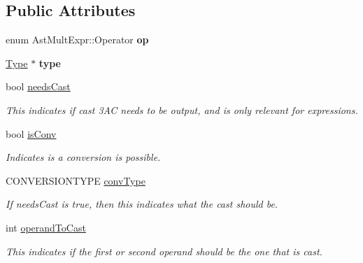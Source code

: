 \subsection*{Public Attributes}
\begin{DoxyCompactItemize}
\item 
\hypertarget{classAstMultExpr_a8e5af1710cd0ec88481fb7614dc8ec79}{enum Ast\-Mult\-Expr\-::\-Operator {\bfseries op}}\label{classAstMultExpr_a8e5af1710cd0ec88481fb7614dc8ec79}

\item 
\hypertarget{classAstMultExpr_a150b539fed2edaa374037362d9ae7c8a}{\hyperlink{classType}{Type} $\ast$ {\bfseries type}}\label{classAstMultExpr_a150b539fed2edaa374037362d9ae7c8a}

\item 
\hypertarget{classAST_aaf215802de409f8096c063d01ffa6783}{bool \hyperlink{classAST_aaf215802de409f8096c063d01ffa6783}{needs\-Cast}}\label{classAST_aaf215802de409f8096c063d01ffa6783}

\begin{DoxyCompactList}\small\item\em This indicates if cast 3\-A\-C needs to be output, and is only relevant for expressions. \end{DoxyCompactList}\item 
\hypertarget{classAST_afa9e77ef650ec6664458fa6cb55be985}{bool \hyperlink{classAST_afa9e77ef650ec6664458fa6cb55be985}{is\-Conv}}\label{classAST_afa9e77ef650ec6664458fa6cb55be985}

\begin{DoxyCompactList}\small\item\em Indicates is a conversion is possible. \end{DoxyCompactList}\item 
\hypertarget{classAST_a61ef3317e023d45237e06615b387cd6b}{C\-O\-N\-V\-E\-R\-S\-I\-O\-N\-T\-Y\-P\-E \hyperlink{classAST_a61ef3317e023d45237e06615b387cd6b}{conv\-Type}}\label{classAST_a61ef3317e023d45237e06615b387cd6b}

\begin{DoxyCompactList}\small\item\em If needs\-Cast is true, then this indicates what the cast should be. \end{DoxyCompactList}\item 
\hypertarget{classAST_aea9b07b39d24183f38c0029cec0a878e}{int \hyperlink{classAST_aea9b07b39d24183f38c0029cec0a878e}{operand\-To\-Cast}}\label{classAST_aea9b07b39d24183f38c0029cec0a878e}

\begin{DoxyCompactList}\small\item\em This indicates if the first or second operand should be the one that is cast. \end{DoxyCompactList}\end{DoxyCompactItemize}
